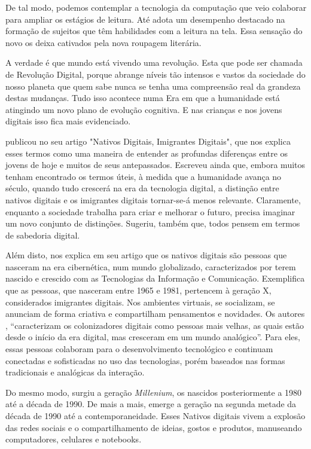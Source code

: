 \begin{refsection}
    De tal modo, podemos contemplar a tecnologia da computação que veio colaborar para ampliar os estágios de leitura. Até adota um desempenho destacado na formação de sujeitos que têm habilidades com a leitura na tela. Essa sensação do novo os deixa cativados pela nova roupagem literária.  

    A verdade é que mundo está vivendo uma revolução. Esta que pode ser chamada de Revolução Digital, porque abrange níveis tão intensos e vastos da sociedade do nosso planeta que quem sabe nunca se tenha uma compreensão real da grandeza destas mudanças. Tudo isso acontece numa Era em que a humanidade está atingindo um novo plano de evolução cognitiva. E nas crianças e nos jovens digitais isso fica mais evidenciado.  

    \textcite{Prensky2001Nativos} publicou no seu artigo "Nativos Digitais, Imigrantes Digitais", que nos explica esses termos como uma  maneira de entender as profundas diferenças entre os jovens de hoje e muitos de seus antepassados. Escreveu ainda que, embora muitos tenham encontrado os termos úteis, à medida que a humanidade avança no século, quando tudo crescerá na era da tecnologia digital, a distinção entre nativos digitais e os imigrantes digitais tornar-se-á menos relevante. Claramente, enquanto a sociedade trabalha para criar e melhorar o futuro, precisa imaginar um novo conjunto de distinções. Sugeriu, também que, todos pensem em termos de sabedoria digital.   

    Além disto, \textcite{Gomes2009Nativos} nos explica em seu artigo que os nativos digitais são pessoas que nasceram na era cibernética, num mundo globalizado, caracterizados por terem nascido e crescido com as Tecnologias da Informação  e Comunicação. Exemplifica que as pessoas, que nasceram entre 1965 e 1981, pertencem à geração X, considerados imigrantes digitais. Nos ambientes virtuais, se socializam, se anunciam de forma criativa e compartilham pensamentos e novidades. Os autores \textcite[p.~13]{PalfreyAndGasser2011Nascidos}, “caracterizam os colonizadores digitais como pessoas mais velhas, as quais estão desde o início da era digital, mas cresceram em um mundo analógico”. Para eles, essas pessoas colaboram para o desenvolvimento tecnológico e continuam conectadas e sofisticadas no uso das tecnologias, porém baseados nas formas tradicionais e analógicas da interação.  

    Do mesmo modo, surgiu a geração \textit{Millenium}, os nascidos posteriormente a 1980 até a década de 1990. De mais a mais, emerge a geração na segunda metade da década de 1990 até a contemporaneidade. Esses Nativos digitais vivem a explosão das redes sociais e o compartilhamento de ideias, gostos e produtos, manuseando computadores, celulares e notebooks.  


\end{refsection}
